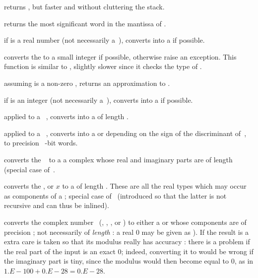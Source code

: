  returns , but
faster and without cluttering the stack.

 returns the most significant word
in the mantissa of .

 if  is a real number (not necessarily
a~), converts  into a  if possible.

 converts the   to a small
integer if possible, otherwise raise an exception. This function
is similar to , slightly slower since it checks the type of .

 assuming  is a non-zero ,
returns an approximation to .

 if  is an integer (not necessarily
a~), converts  into a  if possible.

 applied to a ~, converts
 into a  of length .

 applied to a ~, converts
 into a  or  depending on the sign of the
discriminant of~, to precision \hbox{ \B-bit} words.

 converts the ~ to a
a complex whose real and imaginary parts are  of length 
(special case of~.

 converts the
,  or  $x$ to a  of length .
These are all the real types which may occur as components of a
; special case of~ (introduced so that the latter is
not recursive and can thus be inlined).

 converts the complex number~
(, , ,  or ) to either
a  or  whose components are  of precision
; not necessarily of \emph{length} : a real $0$ may be
given as ). If the result is a  extra care is
taken so that its modulus really has accuracy : there is a problem
if the real part of the input is an exact $0$; indeed, converting it to
 would be wrong if the imaginary part is tiny, since the
modulus would then become equal to $0$, as in $1.E-100 + 0.E-28 = 0.E-28$.

